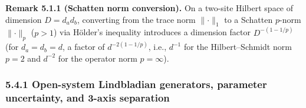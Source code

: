 \documentclass[
  11pt,
]{article}
\begin{document}
\textbf{Remark 5.1.1 (Schatten norm conversion).} On a two-site Hilbert space of dimension \(D = d_a d_b\), converting from the trace norm \(\lVert \cdot\rVert_1\) to a Schatten \(p\)-norm \(\lVert \cdot\rVert_p\) (\(p > 1\)) via Hölder's inequality introduces a dimension factor \(D^{-(1 - 1/p)}\) (for \(d_a = d_b = d\), a factor of \(d^{-2(1 - 1/p)}\), i.e., \(d^{-1}\) for the Hilbert--Schmidt norm \(p=2\) and \(d^{-2}\) for the operator norm \(p=\infty\)).

\subsubsection{5.4.1 Open-system Lindbladian generators, parameter uncertainty, and 3-axis separation}\label{open-system-lindbladian-generators-parameter-uncertainty-and-3-axis-separation}
\end{document}
